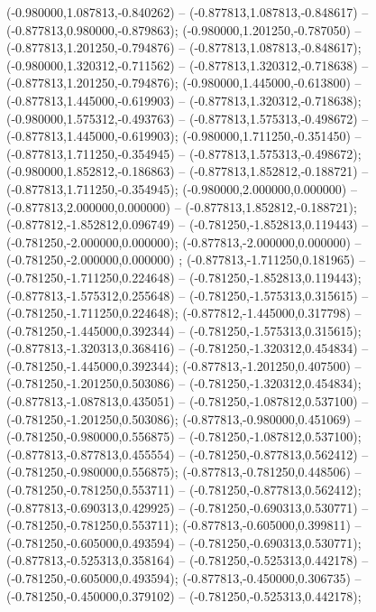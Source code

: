  (-0.980000,1.087813,-0.840262) -- (-0.877813,1.087813,-0.848617) -- (-0.877813,0.980000,-0.879863);
 (-0.980000,1.201250,-0.787050) -- (-0.877813,1.201250,-0.794876) -- (-0.877813,1.087813,-0.848617);
 (-0.980000,1.320312,-0.711562) -- (-0.877813,1.320312,-0.718638) -- (-0.877813,1.201250,-0.794876);
 (-0.980000,1.445000,-0.613800) -- (-0.877813,1.445000,-0.619903) -- (-0.877813,1.320312,-0.718638);
 (-0.980000,1.575312,-0.493763) -- (-0.877813,1.575313,-0.498672) -- (-0.877813,1.445000,-0.619903);
 (-0.980000,1.711250,-0.351450) -- (-0.877813,1.711250,-0.354945) -- (-0.877813,1.575313,-0.498672);
 (-0.980000,1.852812,-0.186863) -- (-0.877813,1.852812,-0.188721) -- (-0.877813,1.711250,-0.354945);
 (-0.980000,2.000000,0.000000) -- (-0.877813,2.000000,0.000000) -- (-0.877813,1.852812,-0.188721);
 (-0.877812,-1.852812,0.096749) -- (-0.781250,-1.852813,0.119443) -- (-0.781250,-2.000000,0.000000);
 (-0.877813,-2.000000,0.000000) -- (-0.781250,-2.000000,0.000000) ;
 (-0.877813,-1.711250,0.181965) -- (-0.781250,-1.711250,0.224648) -- (-0.781250,-1.852813,0.119443);
 (-0.877813,-1.575312,0.255648) -- (-0.781250,-1.575313,0.315615) -- (-0.781250,-1.711250,0.224648);
 (-0.877812,-1.445000,0.317798) -- (-0.781250,-1.445000,0.392344) -- (-0.781250,-1.575313,0.315615);
 (-0.877813,-1.320313,0.368416) -- (-0.781250,-1.320312,0.454834) -- (-0.781250,-1.445000,0.392344);
 (-0.877813,-1.201250,0.407500) -- (-0.781250,-1.201250,0.503086) -- (-0.781250,-1.320312,0.454834);
 (-0.877813,-1.087813,0.435051) -- (-0.781250,-1.087812,0.537100) -- (-0.781250,-1.201250,0.503086);
 (-0.877813,-0.980000,0.451069) -- (-0.781250,-0.980000,0.556875) -- (-0.781250,-1.087812,0.537100);
 (-0.877813,-0.877813,0.455554) -- (-0.781250,-0.877813,0.562412) -- (-0.781250,-0.980000,0.556875);
 (-0.877813,-0.781250,0.448506) -- (-0.781250,-0.781250,0.553711) -- (-0.781250,-0.877813,0.562412);
 (-0.877813,-0.690313,0.429925) -- (-0.781250,-0.690313,0.530771) -- (-0.781250,-0.781250,0.553711);
 (-0.877813,-0.605000,0.399811) -- (-0.781250,-0.605000,0.493594) -- (-0.781250,-0.690313,0.530771);
 (-0.877813,-0.525313,0.358164) -- (-0.781250,-0.525313,0.442178) -- (-0.781250,-0.605000,0.493594);
 (-0.877813,-0.450000,0.306735) -- (-0.781250,-0.450000,0.379102) -- (-0.781250,-0.525313,0.442178);
